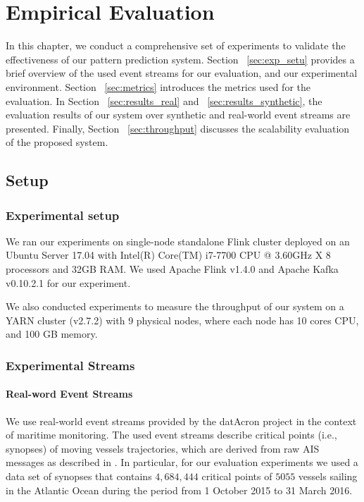 \chapter{Empirical Evaluation}
\label{chapter:evaluation}

\par In this chapter, we conduct a comprehensive set of experiments to validate the effectiveness of our pattern prediction system. Section ~\ref{sec:exp_setu} provides a brief overview of the used event streams for our evaluation, and our experimental environment. Section ~\ref{sec:metrics} introduces the metrics used for the evaluation. In Section ~\ref{sec:results_real} and ~\ref{sec:results_synthetic}, the evaluation results of our system over synthetic and real-world event streams are presented. Finally, Section ~\ref{sec:throughput} discusses the scalability evaluation of the proposed system.  

\section{Setup}
\label{sec:setup_data}

\subsection*{Experimental setup}
\label{sec:exp_setu}
\par We ran our experiments on single-node standalone Flink cluster deployed on an Ubuntu Server 17.04 with Intel(R) Core(TM) i7-7700 CPU @ 3.60GHz X 8 processors and 32GB RAM. We used Apache Flink v1.4.0 and Apache Kafka v0.10.2.1 for our experiment.

\par We also conducted experiments to measure the throughput of our system on a YARN cluster (v2.7.2) with 9 physical nodes, where each node has 10 cores CPU, and 100 GB memory.



\subsection*{Experimental Streams}

\subsubsection*{Real-word Event Streams}
We use real-world event streams provided by the datAcron project in the context of maritime monitoring. The used event streams describe critical points (i.e., synopses) of moving vessels trajectories, which are derived from raw AIS messages as described in \cite{synopses1}. In particular, for our evaluation experiments we used a data set of synopses that contains $4,684,444$ critical points of $5055$ vessels sailing in the Atlantic Ocean during the period from 1 October 2015 to 31 March 2016.

